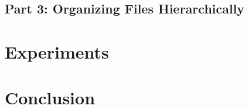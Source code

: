 \documentclass{article}
\begin{document}
\subsection{Part 3: Organizing Files Hierarchically}

\section{Experiments}

\section{Conclusion}


\printbibliography
\end{document}
